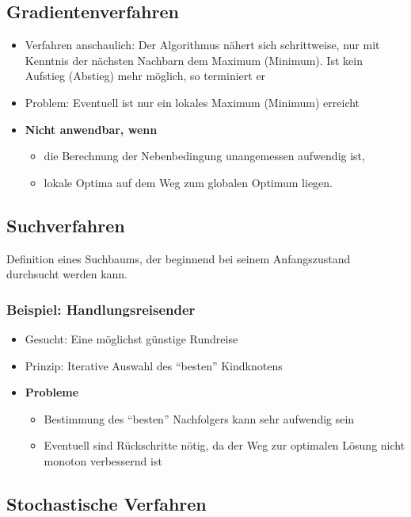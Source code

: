 \subsection{Gradientenverfahren}
\begin{itemize}
	\item Verfahren anschaulich: Der Algorithmus nähert sich schrittweise, nur mit Kenntnis der nächsten Nachbarn dem Maximum (Minimum). Ist kein Aufstieg (Abstieg) mehr möglich, so terminiert er
	\item Problem: Eventuell ist nur ein lokales Maximum (Minimum) erreicht
	\item \textbf{Nicht anwendbar, wenn}
	\begin{itemize}
		\item die Berechnung der Nebenbedingung unangemessen aufwendig ist,
		\item lokale Optima auf dem Weg zum globalen Optimum liegen.
	\end{itemize}
\end{itemize}


\subsection{Suchverfahren}
Definition eines Suchbaums, der beginnend bei seinem Anfangszustand durchsucht werden kann.

\subsubsection{Beispiel: Handlungsreisender}
\begin{itemize}
	\item Gesucht: Eine möglichst günstige Rundreise
	\item Prinzip: Iterative Auswahl des "`besten"' Kindknotens
	\item \textbf{Probleme}
	\begin{itemize}
		\item Bestimmung des "`besten"' Nachfolgers kann sehr aufwendig sein
		\item Eventuell sind Rückschritte nötig, da der Weg zur optimalen Lösung nicht monoton verbessernd ist
	\end{itemize}
\end{itemize}


\subsection{Stochastische Verfahren}

